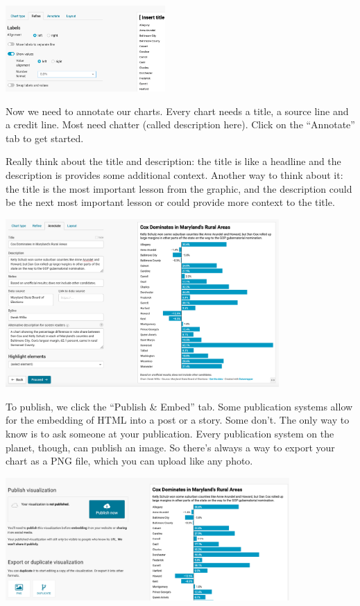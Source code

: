 \documentclass[
  letterpaper,
  DIV=11,
  numbers=noendperiod]{scrreprt}
\begin{document}
\includegraphics[width=2.4in,height=\textheight]{./images/datawrapper4.png}

Now we need to annotate our charts. Every chart needs a title, a source
line and a credit line. Most need chatter (called description here).
Click on the ``Annotate'' tab to get started.

Really think about the title and description: the title is like a
headline and the description is provides some additional context.
Another way to think about it: the title is the most important lesson
from the graphic, and the description could be the next most important
lesson or could provide more context to the title.

\includegraphics[width=4.1in,height=\textheight]{./images/datawrapper5.png}

To publish, we click the ``Publish \& Embed'' tab. Some publication
systems allow for the embedding of HTML into a post or a story. Some
don't. The only way to know is to ask someone at your publication. Every
publication system on the planet, though, can publish an image. So
there's always a way to export your chart as a PNG file, which you can
upload like any photo.

\includegraphics[width=4.26in,height=\textheight]{./images/datawrapper6.png}
\end{document}
